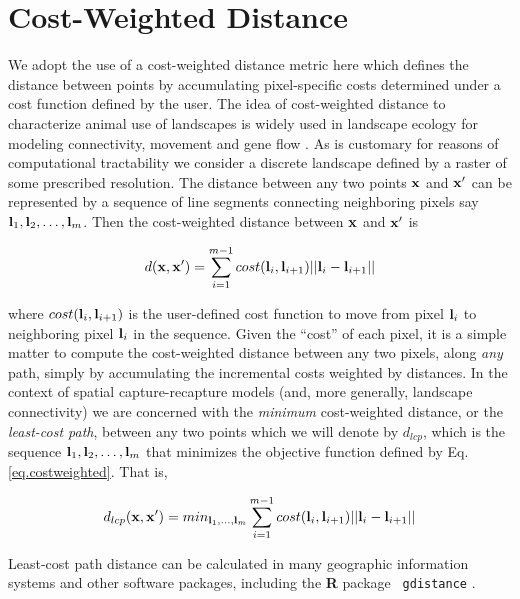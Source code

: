 \section{Cost-Weighted Distance}

We adopt the use of a cost-weighted distance metric here which defines
the distance between points by accumulating pixel-specific costs
determined under a cost function defined by the user.  The idea of
cost-weighted distance to characterize animal use of landscapes is
widely used in landscape ecology for modeling connectivity, movement
and gene flow \citep{beier_etal:2008}. As is customary for reasons of
computational tractability we consider a discrete landscape defined by
a raster of some prescribed resolution. The distance between any two
points ${\bf x}$ and ${\bf x}'$ can be represented by a sequence of
line segments connecting neighboring pixels say ${\bf l}_{1},{\bf
  l}_{2},\ldots,{\bf l}_{m}$. Then the cost-weighted distance between
${\bf x}$ and ${\bf x}'$ is

\begin{equation}
 d({\bf x},{\bf x}')
  =  \sum_{i=1}^{m-1} cost({\bf l}_{i},{\bf l}_{i+1})||{\bf l}_{i} - {\bf l}_{i+1}||
\label{eq.costweighted}
\end{equation}

{\flushleft
where } $cost({\bf l}_{i},{\bf l}_{i+1})$ is the user-defined cost function
to move
from pixel ${\bf l}_{i}$ to neighboring pixel ${\bf l}_{i}$ in the sequence.
Given the ``cost'' of each pixel, it is a simple matter to compute the
cost-weighted distance between any two pixels, along {\it any} path,
simply by accumulating the incremental  costs weighted by
distances.
In the context of
spatial capture-recapture models (and, more generally, landscape
connectivity) we are concerned with the {\it minimum} cost-weighted
distance, or the {\it least-cost path}, between any two points which
we will denote by $d_{lcp}$, which is
the
sequence ${\bf l}_{1},{\bf l}_{2},\ldots,{\bf l}_{m}$ that minimizes
the objective function defined by Eq. \ref{eq.costweighted}. That is,

\begin{equation}
 d_{lcp}({\bf x},{\bf x}')
  =  min_{{\bf l}_{1},\ldots,{\bf l}_{m}}  \sum_{i=1}^{m-1} cost({\bf l}_{i},{\bf l}_{i+1})||{\bf l}_{i} - {\bf l}_{i+1}||
\label{eq.lcp}
\end{equation}

{\flushleft
 Least-cost} path distance can be calculated in
 many geographic information systems and other software packages,
including the {\bf R} package \mbox{\tt
  gdistance} \citep{vanetten:2011}.

